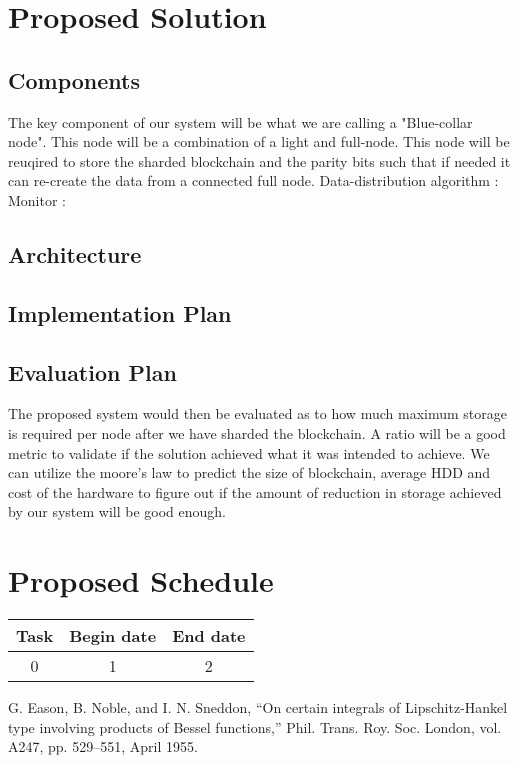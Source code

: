 \documentclass[conference]{IEEEtran}
\begin{document}
\section{Proposed Solution}
\subsection{Components}
The key component of our system will be what we are calling a "Blue-collar node".
This node will be a combination of a light and full-node. This node will be
reuqired to store the sharded blockchain and the parity bits such that if needed
it can re-create the data from a connected full node. 
Data-distribution algorithm : 
Monitor : 

\subsection{Architecture}

\subsection{Implementation Plan}

\subsection{Evaluation Plan}
The proposed system would then be evaluated as to how much maximum storage is
required per node after we have sharded the blockchain. A ratio will be a good
metric to validate if the solution achieved what it was intended to achieve.
We can utilize the moore's law to predict the size of blockchain, average HDD
and cost of the hardware to figure out if the amount of reduction in storage
achieved by our system will be good enough.

\section{Proposed Schedule}
\begin{tabular}{|c||c||c|}
    \hline
    \textbf{Task} & \textbf{Begin date} & \textbf{End date} \\
    \hline
    0 & 1 & 2 \\
    \hline
\end{tabular}

\cite{b1}


\begin{thebibliography}{00}
 G. Eason, B. Noble, and I. N. Sneddon, ``On certain integrals of Lipschitz-Hankel type involving products of Bessel functions,'' Phil. Trans. Roy. Soc. London, vol. A247, pp. 529--551, April 1955.
\end{thebibliography}
\end{document}
